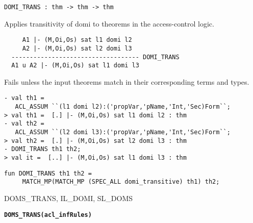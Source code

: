 \begin{verbatim}
DOMI_TRANS : thm -> thm -> thm
\end{verbatim}

\SYNOPSIS
Applies transitivity of domi to theorems in the access-control logic.

\DESCRIBE

\begin{verbatim}
     A1 |- (M,Oi,Os) sat l1 domi l2
     A2 |- (M,Oi,Os) sat l2 domi l3
  ----------------------------------- DOMI_TRANS
  A1 u A2 |- (M,Oi,Os) sat l1 domi l3
\end{verbatim}


\FAILURE 

Fails unless the input theorems match in their corresponding
terms and types.

\EXAMPLE
\begin{holboxed}
\begin{verbatim}
- val th1 = 
   ACL_ASSUM ``(l1 domi l2):('propVar,'pName,'Int,'Sec)Form``;
> val th1 =  [.] |- (M,Oi,Os) sat l1 domi l2 : thm
- val th2 = 
   ACL_ASSUM ``(l2 domi l3):('propVar,'pName,'Int,'Sec)Form``;
> val th2 =  [.] |- (M,Oi,Os) sat l2 domi l3 : thm
- DOMI_TRANS th1 th2;
> val it =  [..] |- (M,Oi,Os) sat l1 domi l3 : thm
\end{verbatim}
\end{holboxed}


\IMPLEMENTATION
\begin{holboxed}
\begin{verbatim}
fun DOMI_TRANS th1 th2 =
     MATCH_MP(MATCH_MP (SPEC_ALL domi_transitive) th1) th2;
\end{verbatim}
\end{holboxed}

\SEEALSO
DOMS\_TRANS, IL\_DOMI, SL\_DOMS
\ENDDOC

\begin{holboxed}
  \begin{Large}
    \textbf{\texttt{DOMS_TRANS}}\hfill{}\textbf{\texttt{(acl\_infRules)}}
  \end{Large}
\end{holboxed}

